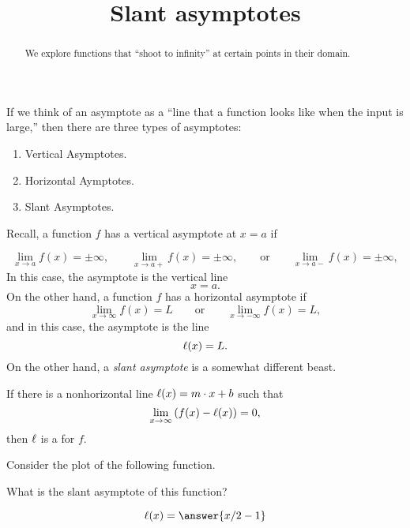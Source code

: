 \documentclass{ximera}
\title[Dig-In:]{Slant asymptotes}
\begin{document}
\begin{abstract}
We explore functions that ``shoot to infinity'' at certain points in
their domain.
\end{abstract}
\maketitle

If we think of an asymptote as a ``line that a function looks like
when the input is large,'' then there are three types of asymptotes:
\begin{enumerate}
\item Vertical Asymptotes.
\item Horizontal Aymptotes.
\item Slant Asymptotes.
\end{enumerate}

Recall, a function $f$ has a vertical asymptote at $x=a$ if

\[
\lim_{x\to a} f(x) = \pm\infty, \qquad \lim_{x\to a+} f(x) = \pm\infty, \qquad\text{or}\qquad \lim_{x\to a-} f(x) = \pm\infty,
\]
In this case, the asymptote is the vertical line
\[
x = a.
\]
On the other hand, a function $f$ has a horizontal asymptote if
\[
\lim_{x\to \infty} f(x) = L \qquad\text{or}\qquad \lim_{x\to -\infty}
f(x) = L,
\]
and in this case, the asymptote is the line
\[
\ell(x) = L.
\]
On the other hand, a \textit{slant asymptote} is a somewhat different
beast.

\begin{definition}
  If there is a nonhorizontal line $\ell(x) = m\cdot x+b$ such that
  \[
  \lim_{x\to \infty}\left(f(x) - \l(x)\right) = 0,
  \]
  then $\ell$ is a  for $f$.
\end{definition}
\begin{question}
  Consider the plot of the following function. 
  \begin{image}
  \end{image}
  What is the slant asymptote of this function?
  \begin{prompt}
    \[
    \l(x) = \answer{x/2 -1}
    \]
  \end{prompt}
\end{question}
\end{document}
